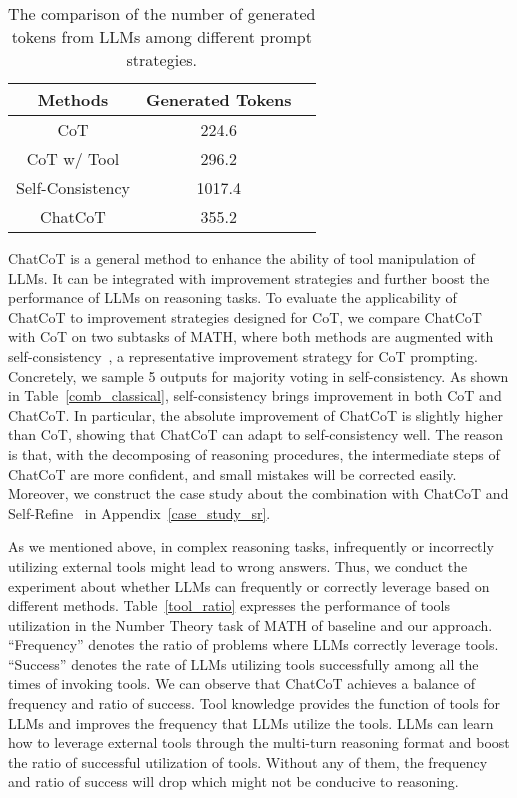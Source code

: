\begin{table}[t]
    \centering
    \begin{tabular}{ccc}
        \bottomrule
        \textbf{Methods} & \textbf{Generated Tokens} \\
        \hline
        CoT & 224.6 \\
        CoT w/ Tool & 296.2 \\
        Self-Consistency & 1017.4 \\
        ChatCoT & 355.2 \\
        \bottomrule
    \end{tabular}
    \caption{The comparison of the number of generated tokens from LLMs among different prompt strategies.}
    \label{generated_tokens}
\end{table}

ChatCoT is a general method to enhance the ability of tool manipulation of LLMs.
It can be integrated with improvement strategies and further boost the performance of LLMs on reasoning tasks.
To evaluate the applicability of ChatCoT to improvement strategies designed for CoT, we compare ChatCoT with CoT on two subtasks of MATH, where both methods are augmented with self-consistency~\cite{self-consistency}, a representative improvement strategy for CoT prompting. 
Concretely, we sample 5 outputs for majority voting in self-consistency.
As shown in Table~\ref{comb_classical}, self-consistency brings improvement in both CoT and ChatCoT.
In particular, the absolute improvement of ChatCoT is slightly higher than CoT, showing that ChatCoT can adapt to self-consistency well.
The reason is that, with the decomposing of reasoning procedures, the intermediate steps of ChatCoT are more confident, and small mistakes will be corrected easily.
Moreover, we construct the case study about the combination with ChatCoT and Self-Refine~\cite{self-refine} in Appendix~\ref{case_study_sr}.

As we mentioned above, in complex reasoning tasks, infrequently or incorrectly utilizing external tools might lead to wrong answers.
Thus, we conduct the experiment about whether LLMs can frequently or correctly leverage based on different methods.
Table~\ref{tool_ratio} expresses the performance of tools utilization in the Number Theory task of MATH of baseline and our approach.
``Frequency'' denotes the ratio of problems where LLMs correctly leverage tools. 
``Success'' denotes the rate of LLMs utilizing tools successfully among all the times of invoking tools.
We can observe that ChatCoT achieves a balance of frequency and ratio of success.
Tool knowledge provides the function of tools for LLMs and improves the frequency that LLMs utilize the tools.
LLMs can learn how to leverage external tools through the multi-turn reasoning format and boost the ratio of successful utilization of tools. 
Without any of them, the frequency and ratio of success will drop which might not be conducive to reasoning.

